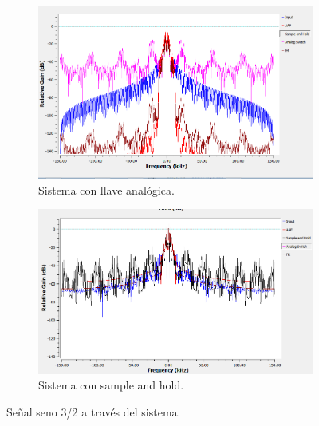 \begin{figure}[H]
	\begin{subfigure}{.5\textwidth}
	\centering
	\includegraphics[width=\textwidth]{SimulacionesGNURADIO/Condiciones_optimas/SENO32_FFT_LLAVE_BC.PNG}
		\caption{Sistema con llave analógica.}	
	\end{subfigure}
	\begin{subfigure}{.5\textwidth}
	\centering
	\includegraphics[width=\textwidth]{SimulacionesGNURADIO/Condiciones_optimas/SENO32_FFT_SAMPLE_AND_HOLD_BC.PNG}
		\caption{Sistema con sample and hold.}	
	\end{subfigure}
	\caption{Señal seno 3/2 a través del sistema.}
\end{figure}


